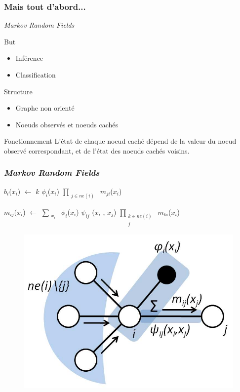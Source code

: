 \documentclass[12pt]{beamer}
\begin{document}
\begin{frame}
  \frametitle{Mais tout d'abord...}
  \textit{Markov Random Fields}
  \begin{block}{But}
  \begin{itemize}
   \item Inférence
   \item Classification
  \end{itemize}
  \end{block}
  
  \begin{block}{Structure}
  \begin{itemize}
   \item Graphe non orienté
   \item Noeuds observés et noeuds cachés
  \end{itemize}
  \end{block}
  
  \begin{block}{Fonctionnement}
  L'état de chaque noeud caché dépend de la valeur du noeud observé correspondant,
  et de l'état des noeuds cachés voisins.
  \end{block}
\end{frame}

\begin{frame}
  \frametitle{\textit{Markov Random Fields}}
  
  $b_i$($x_i$) $\leftarrow$ $k$ $\phi_i$($x_i$) $\prod_{\substack{j \in ne(i)}}$ $m_{ji}$($x_i$)
  \linebreak
  
  $m_{ij}$($x_i$) $\leftarrow$ $\sum_{\substack{x_i}}$ $\phi_i$($x_i$) $\psi_{ij}$ ($x_i$ , $x_j$) $\prod_{\substack{k \in ne(i) \\ j}}$ $m_{ki}$($x_i$)
  
  \begin{figure}[h]
  \centering
  \includegraphics[scale=0.2]{schemaMRF.png}
  \end{figure}
\end{frame}
\end{document}
